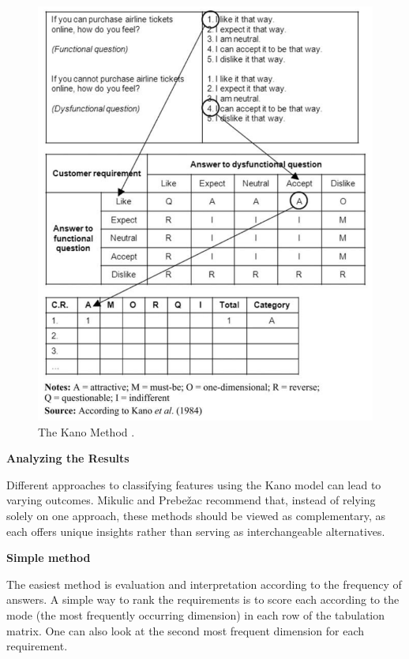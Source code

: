 \documentclass[../main.tex]{subfiles}
\begin{document}
\begin{figure}[h]
        \centering
        \includegraphics[scale=0.8]{img/3-background/kano/kanomodel.png}
        \caption{The Kano Method \cite{kanomodel1996}.}
        \label{fig:kanomodel}
\end{figure}

\clearpage
\textbf{Analyzing the Results}

Different approaches to classifying features using the Kano model can lead to varying outcomes. Mikulic and Prebežac \cite{mikulic2011} recommend that, instead of relying solely on one approach, these methods should be viewed as complementary, as each offers unique insights rather than serving as interchangeable alternatives. 

\textbf{Simple method}

The easiest method is evaluation and interpretation according to the frequency of answers. A simple way to rank the requirements is to score each according to the mode (the most frequently occurring dimension) in each row of the tabulation matrix. One can also look at the second most frequent dimension for each requirement. \cite{berger1993kano}
\end{document}
